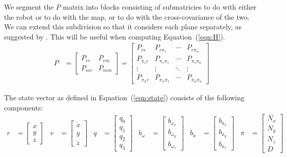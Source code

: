 \documentclass[]{article}
\begin{document}
{We segment the $P$ matrix into blocks consisting of submatricies to do with either the robot or to do with the map, or to do with the cross-covariance of the two. We can extend this subdivision so that it considers each plane separately, as suggested by \cite{Sola2013}.
This will be useful when computing Equation~(\ref{eqn:H}).
\begin{align}
	P &=
	\left[
	\begin{matrix}
		P_{rr} 	& P_{rm} \\
		P_{mr} 	& P_{mm}
	\end{matrix}
	\right]
	=
	\left[
	\begin{matrix}
		P_{rr} 		& P_{r \pi_1} 		& \cdots 	& P_{r \pi_n} \\
		P_{\pi_1 r} & P_{\pi_1 \pi_1}	& \cdots 	& P_{\pi_1 \pi_n} \\
		\vdots		& \vdots 			& \ddots 	& \vdots \\
		P_{\pi_n r} & P_{\pi_n \pi_1} 	& \cdots 	& P_{\pi_n \pi_n}
	\end{matrix}
	\right]
	\label{eqn:Pparts}
\end{align}

The state vector as defined in Equation~(\ref{eqn:state}) consists of the following components:
\begin{align}
	r &= 
	\left[
	\begin{matrix}
		x \\
		y \\
		z
	\end{matrix}
	\right]
	&
	v &=
	\left[
	\begin{matrix}
		\dot{x} \\
		\dot{y} \\
		\dot{z}
	\end{matrix}
	\right]
	&
	q &=
	\left[
	\begin{matrix}
		q_0 \\
		q_1 \\
		q_2 \\
		q_3
	\end{matrix}
	\right]
	&
	b_\omega &=
	\left[
	\begin{matrix}
		b_{\omega_x} \\
		b_{\omega_y} \\
		b_{\omega_z} 
	\end{matrix}
	\right]
	&
	b_a &=
	\left[
	\begin{matrix}
		b_{a_x} \\
		b_{a_y} \\
		b_{a_z} 
	\end{matrix}
	\right]
	&
	\pi &=
	\left[
	\begin{matrix}
		N_x \\
		N_y \\
		N_z \\
		D
	\end{matrix}
	\right]
\end{align}

}
\end{document}
